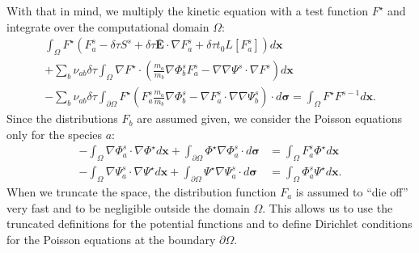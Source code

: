 \documentclass[preprint]{revtex4}
\begin{document}
 With that in mind, we multiply the kinetic equation with a test function $F^{\star}$ and integrate over the computational domain $\Omega$:
\begin{multline}
\int_{\Omega}F^{\star}\left(F_a^s -\delta\tau S^s+\delta\tau\bar{\bm{E}}\cdot\nabla F_a^s+\delta\tau t_0L[F_a^s]\right)d\bm{x}
\\+\sum_b\nu_{ab}\delta\tau\int_{\Omega}\nabla F^{\star}\cdot\left(\frac{m_a}{m_b}\nabla \Phi_b^s F_a^s-\nabla\nabla\Psi^s\cdot\nabla F^s\right)d\bm{x}\\
-\sum_b\nu_{ab}\delta\tau\int_{\partial\Omega}F^{\star}\left(F_a^s\frac{m_a}{m_b}\nabla\Phi_b^s-\nabla F_a^s\cdot\nabla\nabla\Psi_b^s\right)\cdot d\bm{\sigma}
=\int_{\Omega}F^{\star}F^{s-1}d\bm{x}.
\end{multline}
Since the distributions $F_b$ are assumed given, we consider the Poisson equations only for the species $a$:
\begin{align}
-\int_{\Omega}\nabla\Phi_a^s\cdot\nabla\Phi^{\star}d\bm{x}+\int_{\partial\Omega}\Phi^{\star}\nabla\Phi_a^s\cdot d\bm{\sigma}&=\int_{\Omega}F_a^s\Phi^{\star}d\bm{x}\\
-\int_{\Omega}\nabla\Psi_a^s\cdot\nabla\Psi^{\star}d\bm{x}+\int_{\partial\Omega}\Psi^{\star}\nabla\Psi_a^s\cdot d\bm{\sigma}&=\int_{\Omega}\Phi_a^s\Psi^{\star}d\bm{x}.
\end{align}
When we truncate the space, the distribution function $F_a$ is assumed to ``die off'' very fast and to be negligible outside the domain $\Omega$. This allows us to use the truncated definitions for the potential functions and to define Dirichlet conditions for the Poisson equations at the boundary $\partial\Omega$. 
\end{document}
